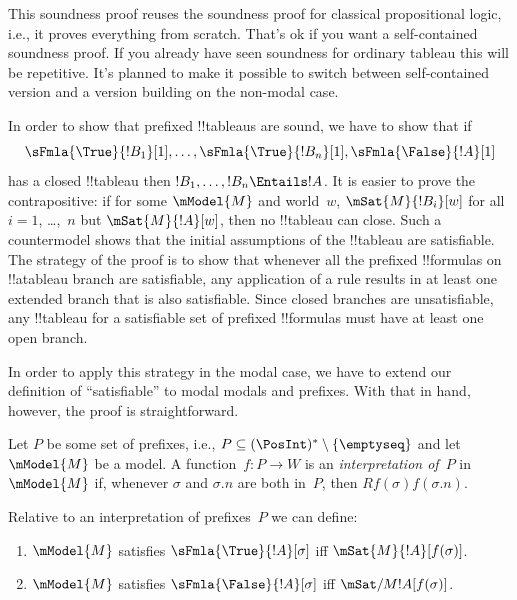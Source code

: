 \documentclass[../../../include/open-logic-section]{subfiles}
\begin{document}


\begin{editorial}
  This soundness proof reuses the soundness proof for classical
  propositional logic, i.e., it proves everything from scratch. That's
  ok if you want a self-contained soundness proof. If you already have
  seen soundness for ordinary tableau this will be repetitive. It's
  planned to make it possible to switch between self-contained version
  and a version building on the non-modal case.
\end{editorial}

\begin{explain}
  In order to show that prefixed !!{tableau}s are sound, we have to
  show that if
  \[
  \sFmla{\True}{!B_1}[1], \dots, \sFmla{\True}{!B_n}[1], \sFmla{\False}{!A}[1]
  \]
  has a closed !!{tableau} then $!B_1, \dots, !B_n \Entails !A$. It is
  easier to prove the contrapositive: if for some $\mModel{M}$ and
  world~$w$, $\mSat{M}{!B_i}[w]$ for all $i=1$, \dots,~$n$ but
  $\mSat{M}{!A}[w]$, then no !!{tableau} can close. Such a
  countermodel shows that the initial assumptions of the !!{tableau}
  are satisfiable. The strategy of the proof is to show that whenever
  all the prefixed !!{formula}s on !!a{tableau} branch are
  satisfiable, any application of a rule results in at least one
  extended branch that is also satisfiable. Since closed branches are
  unsatisfiable, any !!{tableau} for a satisfiable set of prefixed
  !!{formula}s must have at least one open branch.

  In order to apply this strategy in the modal case, we have to extend
  our definition of ``satisfiable'' to modal modals and prefixes. With
  that in hand, however, the proof is straightforward.
\end{explain}

\begin{defn}
  Let $P$ be some set of prefixes, i.e., $P \subseteq (\PosInt)^*
  \setminus \{\emptyseq\}$ and let $\mModel{M}$ be a model.  A
  function~$f\colon P \to W$ is an \emph{interpretation of}~$P$
  in~$\mModel{M}$ if, whenever $\sigma$ and $\sigma.n$ are both
  in~$P$, then $Rf(\sigma)f(\sigma.n)$.

  Relative to an interpretation of prefixes~$P$ we can define:
  \begin{enumerate}
  \item $\mModel{M}$ satisfies $\sFmla{\True}{!A}[\sigma]$ iff
    $\mSat{M}{!A}[f(\sigma)]$.
  \item $\mModel{M}$ satisfies $\sFmla{\False}{!A}[\sigma]$ iff
    $\mSat/{M}{!A}[f(\sigma)]$.
  \end{enumerate}
\end{defn}
\end{document}
